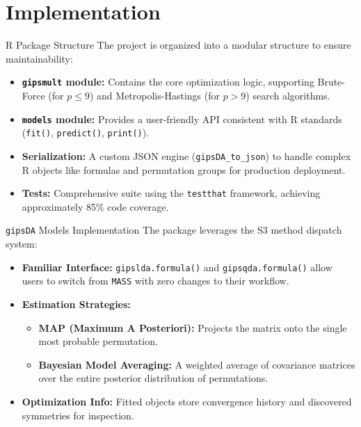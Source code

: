 \documentclass[aspectratio=169,xcolor=dvipsnames]{beamer}
\begin{document}
\section{Implementation}
\begin{frame}{R Package Structure}
    The project is organized into a modular structure to ensure maintainability:
    \begin{itemize}
        \item \textbf{\texttt{gipsmult} module:} Contains the core optimization logic, supporting Brute-Force (for $p \le 9$) and Metropolis-Hastings (for $p > 9$) search algorithms.
        \item \textbf{\texttt{models} module:} Provides a user-friendly API consistent with R standards (\texttt{fit()}, \texttt{predict()}, \texttt{print()}).
        \item \textbf{Serialization:} A custom JSON engine (\texttt{gipsDA\_to\_json}) to handle complex R objects like formulas and permutation groups for production deployment.
        \item \textbf{Tests:} Comprehensive suite using the \texttt{testthat} framework, achieving approximately 85\% code coverage.
    \end{itemize}
\end{frame}

\begin{frame}{\texttt{gipsDA} Models Implementation}
    The package leverages the S3 method dispatch system:
    \begin{itemize}
        \item \textbf{Familiar Interface:} \texttt{gipslda.formula()} and \texttt{gipsqda.formula()} allow users to switch from \texttt{MASS} with zero changes to their workflow.
        \item \textbf{Estimation Strategies:}
        \begin{itemize}
            \item \textbf{MAP (Maximum A Posteriori):} Projects the matrix onto the single most probable permutation.
            \item \textbf{Bayesian Model Averaging:} A weighted average of covariance matrices over the entire posterior distribution of permutations.
        \end{itemize}
        \item \textbf{Optimization Info:} Fitted objects store convergence history and discovered symmetries for inspection.
    \end{itemize}
\end{frame}
\end{document}
